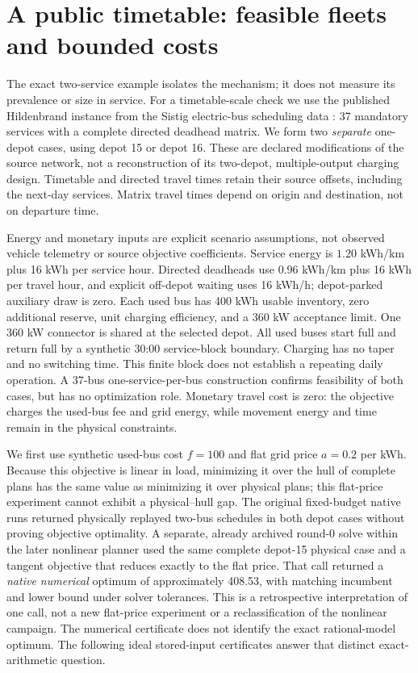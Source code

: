 \section{A public timetable: feasible fleets and bounded costs}\label{sec:public}

The exact two-service example isolates the mechanism; it does not measure
its prevalence or size in service.  For a timetable-scale check we use the
published Hildenbrand instance from the Sistig electric-bus scheduling data
\citep{sistig2025dataset,sistig2025electrification}: 37 mandatory services
with a complete directed deadhead matrix.  We form
two \emph{separate} one-depot cases, using depot 15 or depot 16.  These are
declared modifications of the source network, not a reconstruction of its
two-depot, multiple-output charging design.  Timetable and directed travel
times retain their source offsets, including the next-day services.  Matrix
travel times depend on origin and destination, not on departure time.

Energy and monetary inputs are explicit scenario assumptions, not observed
vehicle telemetry or source objective coefficients.  Service energy is
$1.20$ kWh/km plus 16 kWh per service hour.  Directed deadheads use
$0.96$ kWh/km plus 16 kWh per travel hour, and explicit off-depot waiting
uses 16 kWh/h; depot-parked auxiliary draw is zero.  Each used bus has
400 kWh usable inventory, zero additional reserve, unit charging
efficiency, and a 360 kW acceptance limit.  One 360 kW connector is shared
at the selected depot.  All used buses start full and return full by a
synthetic 30:00 service-block boundary.  Charging has no taper and no
switching time.  This finite block does not establish a repeating daily
operation.  A 37-bus one-service-per-bus construction confirms feasibility
of both cases, but has no optimization role.  Monetary travel cost is zero:
the objective charges the used-bus fee and grid energy, while movement
energy and time remain in the physical constraints.

We first use synthetic used-bus cost $f=100$ and flat grid price
$a=0.2$ per kWh.  Because this objective is linear in load, minimizing it
over the hull of complete plans has the same value as minimizing it over
physical plans; this flat-price experiment cannot exhibit a physical--hull
gap.  The original fixed-budget native runs returned physically replayed
two-bus schedules in both depot cases without proving objective optimality.
A separate, already archived round-0 solve
within the later nonlinear planner used the same complete depot-15 physical
case and a tangent objective that reduces exactly to the flat price.
That call returned a \emph{native numerical} optimum of approximately
408.53, with matching incumbent and lower bound under solver tolerances.
This is a retrospective interpretation of one call, not a new flat-price
experiment or a reclassification of the nonlinear campaign.  The numerical certificate does not identify the exact rational-model
optimum.  The following ideal stored-input certificates answer that
distinct exact-arithmetic question.

